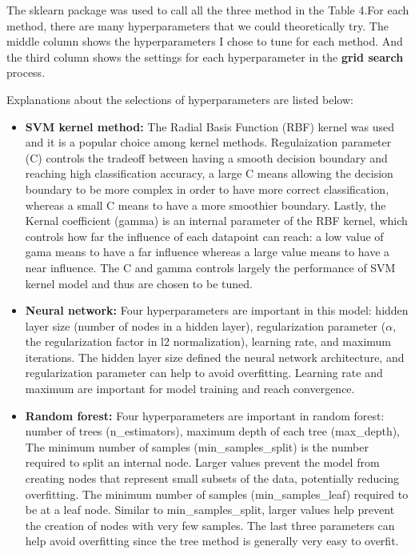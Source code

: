 The sklearn package was used to call all the three method in the Table 4.For each method, there are many hyperparameters that we could theoretically try. The middle column shows the hyperparameters I chose to tune for each method. And the third column shows the settings for each hyperparameter in the \textbf{grid search} process.

Explanations about the selections of hyperparameters are listed below:
\begin{itemize}
    \item \textbf{SVM kernel method: } The Radial Basis Function (RBF) kernel was used and it is a popular choice among kernel methods. Regulaization parameter (C) controls the tradeoff between having a smooth decision boundary and reaching high classification accuracy, a large C means allowing the decision boundary to be more complex in order to have more correct classification, whereas a small C means to have a more smoothier boundary. Lastly, the Kernal coefficient (gamma) is an internal parameter of the RBF kernel, which controls how far the influence of each datapoint can reach: a low value of gama means to have a far influence whereas a large value means to have a near influence. The C and gamma controls largely the performance of SVM kernel model and thus are chosen to be tuned.
    \item \textbf{Neural network: } Four hyperparameters are important in this model: hidden layer size (number of nodes in a hidden layer), regularization parameter ($\alpha$, the regularization factor in l2 normalization), learning rate, and maximum iterations. The hidden layer size defined the neural network architecture, and regularization parameter can help to avoid overfitting. Learning rate and maximum are important for model training and reach convergence.
    \item \textbf{Random forest: } Four hyperparameters are important in random forest: number of trees (n\_estimators), maximum depth of each tree (max\_depth), The minimum number of samples (min\_samples\_split) is the number required to split an internal node. Larger values prevent the model from creating nodes that represent small subsets of the data, potentially reducing overfitting. The minimum number of samples (min\_samples\_leaf) required to be at a leaf node. Similar to min\_samples\_split, larger values help prevent the creation of nodes with very few samples. The last three parameters can help avoid overfitting since the tree method is generally very easy to overfit.
\end{itemize}

